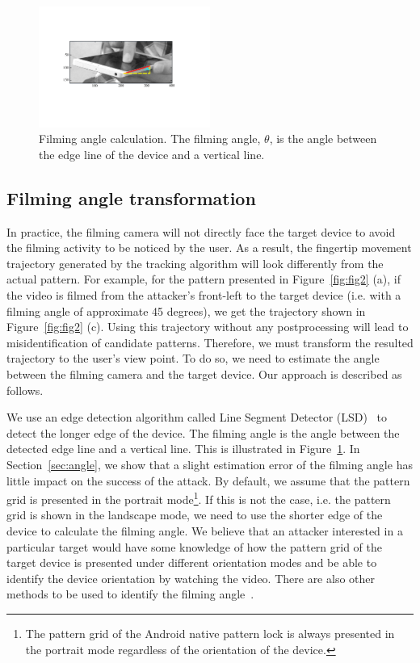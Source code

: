 \begin{figure}[!t]
    \centering
    \includegraphics[width=0.5\textwidth]{fig/line_detection.pdf}
    \caption{Filming angle calculation. The filming angle, $\theta$, is the angle between the edge line of the device and a vertical line.}
        \label{fig:line_detection}
\end{figure}
\subsection{Filming angle transformation}
\label{sec:transformation}
In practice, the filming camera will not directly face the target device to avoid the filming activity to be noticed by the user. As a result, the
fingertip movement trajectory generated by the tracking
algorithm will look differently from the actual pattern. For example, for the
pattern presented in Figure~\ref{fig:fig2} (a), if the video is filmed from the attacker's front-left to the target device (i.e. with a filming angle of approximate 45 degrees),
we get the trajectory shown in Figure~\ref{fig:fig2} (c).
Using this trajectory without any postprocessing will lead to misidentification of candidate patterns.
Therefore, we must transform the resulted trajectory to the user's view point. To do so, we need to estimate the angle between the filming camera and the target device. Our approach is described as follows.

We use an edge detection algorithm called Line Segment Detector (LSD)~\cite{grompone2010lsd} to detect the longer edge of the device.
The filming angle is the angle between the detected edge line and a vertical line. This is illustrated in Figure~\ref{fig:line_detection}.
In Section~\ref{sec:angle}, we show that a slight estimation error of the filming angle has little impact on the success of the attack.
By default, we assume that the pattern grid is presented in the portrait
mode\footnote{The pattern grid of the Android native pattern lock is always presented in the portrait mode regardless of the orientation of the device.}. If this is
not the case, i.e. the pattern grid is shown in the landscape mode, we need
to use the shorter edge of the device to calculate the filming angle. We believe that an attacker interested in a particular target would
have some knowledge of how the pattern grid of the target device is presented under different orientation modes and be able to identify the device orientation by watching the video.
There are also other methods to be used to identify the filming angle~\cite{Torralba:2002:DEI:628330.628820}.


